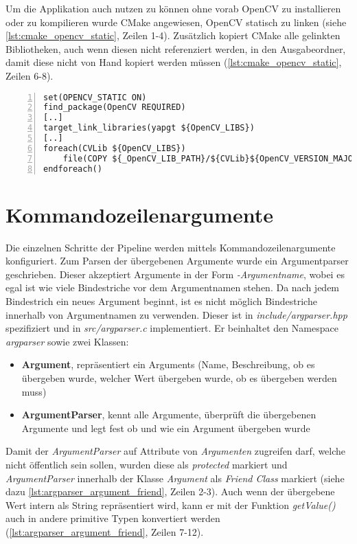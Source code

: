 Um die Applikation auch nutzen zu können ohne vorab OpenCV zu installieren oder zu kompilieren wurde CMake angewiesen, OpenCV statisch zu linken (siehe \autoref{lst:cmake_opencv_static}, Zeilen 1-4).
Zusätzlich kopiert CMake alle gelinkten Bibliotheken, auch wenn diesen nicht referenziert werden, in den Ausgabeordner, damit diese nicht von Hand kopiert werden müssen (\autoref{lst:cmake_opencv_static}, Zeilen 6-8).

\begin{lstlisting}[numbers=left, breaklines=true,breakatwhitespace=false,label=lst:cmake_opencv_static, caption=Ausschnitt von CMakeLists.txt um OpenCV statisch zu linken]
set(OPENCV_STATIC ON)
find_package(OpenCV REQUIRED)
[..]
target_link_libraries(yapgt ${OpenCV_LIBS})
[..]
foreach(CVLib ${OpenCV_LIBS})
    file(COPY ${_OpenCV_LIB_PATH}/${CVLib}${OpenCV_VERSION_MAJOR}${OpenCV_VERSION_MINOR}${OpenCV_VERSION_PATCH}d.dll DESTINATION ${CMAKE_BINARY_DIR})
endforeach()
\end{lstlisting}


\section{Kommandozeilenargumente}
Die einzelnen Schritte der Pipeline werden mittels Kommandozeilenargumente konfiguriert.
Zum Parsen der übergebenen Argumente wurde ein Argumentparser geschrieben.
Dieser akzeptiert Argumente in der Form \emph{-Argumentname}, wobei es egal ist wie viele Bindestriche vor dem Argumentnamen stehen.
Da nach jedem Bindestrich ein neues Argument beginnt, ist es nicht möglich Bindestriche innerhalb von Argumentnamen zu verwenden.
Dieser ist in \emph{include/argparser.hpp} spezifiziert und in \emph{src/argparser.c} implementiert.
Er beinhaltet den Namespace \emph{argparser} sowie zwei Klassen:
\begin{itemize}
\item \textbf{Argument}, repräsentiert ein Arguments (Name, Beschreibung, ob es übergeben wurde, welcher Wert übergeben wurde, ob es übergeben werden muss)
\item \textbf{ArgumentParser}, kennt alle Argumente, überprüft die übergebenen Argumente und legt fest ob und wie ein Argument übergeben wurde
\end{itemize}

Damit der \emph{ArgumentParser} auf Attribute von \emph{Argumenten} zugreifen darf, welche nicht öffentlich sein sollen, wurden diese als \emph{protected} markiert und \emph{ArgumentParser} innerhalb der Klasse \emph{Argument} als \emph{Friend Class} markiert (siehe dazu \autoref{lst:argparser_argument_friend}, Zeilen 2-3).
Auch wenn der übergebene Wert intern als String repräsentiert wird, kann er mit der Funktion \emph{getValue()} auch in andere primitive Typen konvertiert werden (\autoref{lst:argparser_argument_friend}, Zeilen 7-12).

